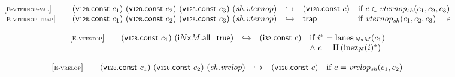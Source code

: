 $$
\begin{array}[t]{@{}lrcl@{}l@{}}
{[\textsc{\scriptsize E{-}vternop{-}val}]} \quad & (\mathsf{v{\scriptstyle 128}}{.}\mathsf{const}~c_1)~(\mathsf{v{\scriptstyle 128}}{.}\mathsf{const}~c_2)~(\mathsf{v{\scriptstyle 128}}{.}\mathsf{const}~c_3)~({\mathit{sh}} {.} {\mathit{vternop}}) & \hookrightarrow & (\mathsf{v{\scriptstyle 128}}{.}\mathsf{const}~c) & \quad \mbox{if}~ c \in {{\mathit{vternop}}}{{}_{{\mathit{sh}}}(c_1, c_2, c_3)} \\
{[\textsc{\scriptsize E{-}vternop{-}trap}]} \quad & (\mathsf{v{\scriptstyle 128}}{.}\mathsf{const}~c_1)~(\mathsf{v{\scriptstyle 128}}{.}\mathsf{const}~c_2)~(\mathsf{v{\scriptstyle 128}}{.}\mathsf{const}~c_3)~({\mathit{sh}} {.} {\mathit{vternop}}) & \hookrightarrow & \mathsf{trap} & \quad \mbox{if}~ {{\mathit{vternop}}}{{}_{{\mathit{sh}}}(c_1, c_2, c_3)} = \epsilon \\
\end{array}
$$

\vspace{1ex}

$$
\begin{array}[t]{@{}lrcl@{}l@{}}
{[\textsc{\scriptsize E{-}vtestop}]} \quad & (\mathsf{v{\scriptstyle 128}}{.}\mathsf{const}~c_1)~({{\mathsf{i}}{N}}{\mathsf{x}}{M} {.} \mathsf{all\_true}) & \hookrightarrow & (\mathsf{i{\scriptstyle 32}}{.}\mathsf{const}~c) & \quad
\begin{array}[t]{@{}l@{}}
\mbox{if}~ {i^\ast} = {{\mathrm{lanes}}}_{{{\mathsf{i}}{N}}{\mathsf{x}}{M}}(c_1) \\
{\land}~ c = {\Pi}\, ({{{\mathrm{inez}}}_{N}(i)^\ast}) \\
\end{array} \\
\end{array}
$$

\vspace{1ex}

$$
\begin{array}[t]{@{}lrcl@{}l@{}}
{[\textsc{\scriptsize E{-}vrelop}]} \quad & (\mathsf{v{\scriptstyle 128}}{.}\mathsf{const}~c_1)~(\mathsf{v{\scriptstyle 128}}{.}\mathsf{const}~c_2)~({\mathit{sh}} {.} {\mathit{vrelop}}) & \hookrightarrow & (\mathsf{v{\scriptstyle 128}}{.}\mathsf{const}~c) & \quad \mbox{if}~ c = {{\mathit{vrelop}}}{{}_{{\mathit{sh}}}(c_1, c_2)} \\
\end{array}
$$

\vspace{1ex}

